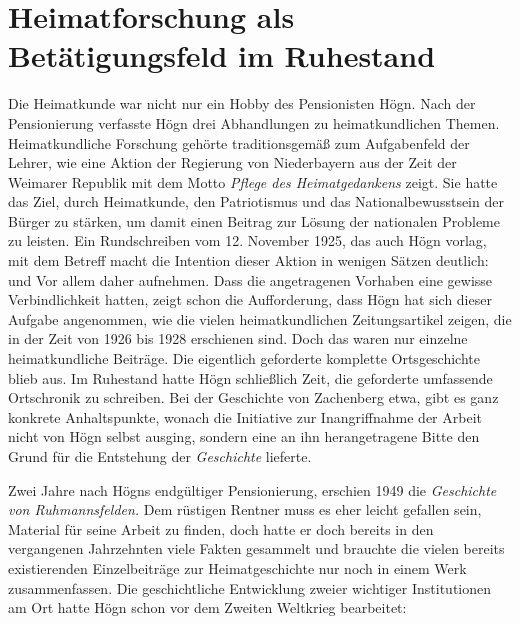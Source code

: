 \section[Heimatforschung]{Heimatforschung als Betätigungsfeld im Ruhestand}

Die Heimatkunde war nicht nur ein Hobby des Pensionisten Högn. Nach der
Pensionierung verfasste Högn drei Abhandlungen zu heimatkundlichen
Themen. Heimatkundliche Forschung gehörte traditionsgemäß zum
Aufgabenfeld der Lehrer, wie eine Aktion der Regierung von Niederbayern
aus der Zeit der Weimarer Republik mit dem Motto \textit{Pflege des
Heimatgedankens} zeigt. Sie hatte das Ziel, durch Heimatkunde, den
Patriotismus und das Nationalbewusstsein der Bürger zu stärken, um
damit einen Beitrag zur Lösung der nationalen Probleme zu leisten.
Ein Rundschreiben vom 12. November 1925, das auch Högn vorlag, mit dem
Betreff  macht
die Intention dieser Aktion in wenigen Sätzen deutlich:
 und
 Vor
allem daher 
aufnehmen. Dass die angetragenen Vorhaben eine gewisse Verbindlichkeit
hatten, zeigt schon die Aufforderung, dass Högn hat sich dieser Aufgabe angenommen, wie die vielen
heimatkundlichen Zeitungsartikel zeigen, die in der Zeit von 1926 bis
1928 erschienen sind. Doch das waren nur einzelne heimatkundliche
Beiträge. Die eigentlich geforderte komplette Ortsgeschichte blieb
aus. Im Ruhestand hatte Högn schließlich Zeit, die geforderte
umfassende Ortschronik zu schreiben. Bei der Geschichte von
Zachenberg etwa, gibt es ganz konkrete Anhaltspunkte, wonach die
Initiative zur Inangriffnahme der Arbeit nicht von Högn selbst ausging,
sondern eine an ihn herangetragene Bitte den Grund für die Entstehung
der \textit{Geschichte} lieferte.

Zwei Jahre nach Högns endgültiger Pensionierung, erschien 1949 die
\textit{Geschichte von Ruhmannsfelden.} Dem rüstigen Rentner muss es
eher leicht gefallen sein, Material für seine Arbeit zu finden, doch
hatte er doch bereits in den vergangenen Jahrzehnten viele Fakten
gesammelt und brauchte die vielen bereits existierenden Einzelbeiträge
zur Heimatgeschichte nur noch in einem Werk zusammenfassen. Die
geschichtliche Entwicklung zweier wichtiger Institutionen am Ort
hatte Högn schon vor dem Zweiten Weltkrieg bearbeitet:

